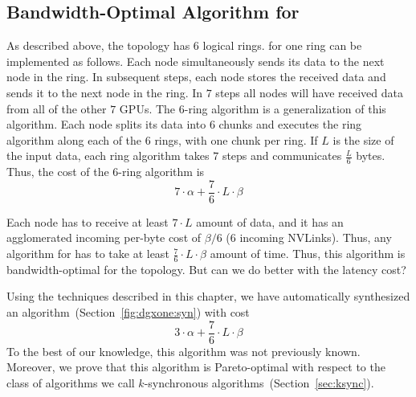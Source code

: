
\subsection{Bandwidth-Optimal Algorithm for \dgxone}
\label{sec:motivation:bw-optimal}
As described above, the \dgxone topology has $6$ logical rings. \allgather for one ring can be implemented as follows. Each node simultaneously sends its data to the next node in the ring. In subsequent steps, each node stores the received data and sends it to the next node in the ring. In $7$ steps all nodes will have received data from all of the other $7$ GPUs. The $6$-ring algorithm is a generalization of this algorithm. Each node splits its data into $6$ chunks and executes the ring algorithm along each of the $6$ rings, with one chunk per ring. If $L$ is the size of the input data, each ring algorithm takes $7$ steps and communicates $\frac{L}{6}$ bytes. Thus, the cost of the $6$-ring algorithm is
$$7\cdot \alpha + \frac{7}{6}\cdot L \cdot \beta$$

Each node has to receive at least $7 \cdot L$ amount of data, and it has an agglomerated incoming per-byte cost of $\beta/6$ (6 incoming NVLinks). Thus, any algorithm for \allgather has to take at least $\frac{7}{6}\cdot L \cdot \beta$ amount of time. Thus, this algorithm is bandwidth-optimal for the \dgxone topology. But can we do better with the latency cost?

Using the techniques described in this chapter, we have automatically synthesized an algorithm~(Section~\ref{fig:dgxone:syn}) with cost $$3\cdot \alpha + \frac{7}{6}\cdot L \cdot \beta$$ To the best of our knowledge, this algorithm was not previously known. Moreover, we prove that this algorithm is Pareto-optimal with respect to the class of algorithms we call $k$-synchronous algorithms~(Section~\ref{sec:ksync}).

